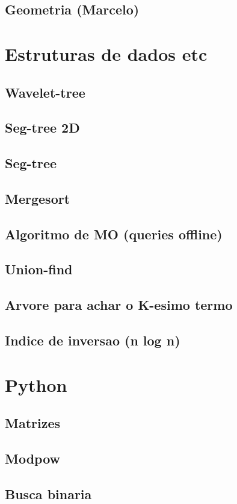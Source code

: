\subsection{Geometria (Marcelo)}
\raggedbottom
\hrulefill
\clearpage
\section{Estruturas de dados etc}
\subsection{Wavelet-tree}
\raggedbottom
\hrulefill
\subsection{Seg-tree 2D}
\raggedbottom
\hrulefill
\subsection{Seg-tree}
\raggedbottom
\hrulefill
\subsection{Mergesort}
\raggedbottom
\hrulefill
\subsection{Algoritmo de MO (queries offline)}
\raggedbottom
\hrulefill
\subsection{Union-find}
\raggedbottom
\hrulefill
\subsection{Arvore para achar o K-esimo termo}
\raggedbottom
\hrulefill
\subsection{Indice de inversao (n log n)}
\raggedbottom
\hrulefill
\clearpage
\section{Python}
\subsection{Matrizes}
\raggedbottom
\hrulefill
\subsection{Modpow}
\raggedbottom
\hrulefill
\subsection{Busca binaria}
\raggedbottom
\hrulefill
\clearpage
